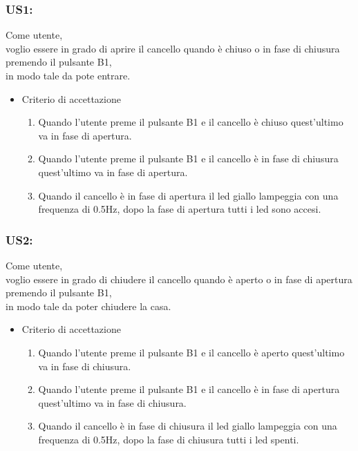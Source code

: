 \documentclass[12pt]{article}
\begin{document}
\subsubsection{US1:}
Come utente, \\
voglio essere in grado di aprire il cancello quando è chiuso o in fase di chiusura premendo il pulsante B1, \\
in modo tale da pote entrare.
\begin{itemize}
    \item Criterio di accettazione
    \begin{enumerate}
        \item Quando l'utente preme il pulsante B1 e il cancello è chiuso quest'ultimo va in fase di apertura.
        \item Quando l'utente preme il pulsante B1 e il cancello è in fase di chiusura quest'ultimo va in fase di apertura.
        \item Quando il cancello è in fase di apertura il led giallo lampeggia con una frequenza di 0.5Hz, dopo la fase di apertura tutti i led sono accesi.
    \end{enumerate}
\end{itemize}
\subsubsection{US2:}
Come utente, \\
voglio essere in grado di chiudere il cancello quando è aperto o in fase di apertura premendo il pulsante B1, \\
in modo tale da poter chiudere la casa.
\begin{itemize}
    \item Criterio di accettazione
    \begin{enumerate}
        \item Quando l'utente preme il pulsante B1 e il cancello è aperto quest'ultimo va in fase di chiusura.
        \item Quando l'utente preme il pulsante B1 e il cancello è in fase di apertura quest'ultimo va in fase di chiusura.
        \item Quando il cancello è in fase di chiusura il led giallo lampeggia con una frequenza di 0.5Hz, dopo la fase di chiusura tutti i led spenti.
    \end{enumerate}
\end{itemize}
\end{document}
